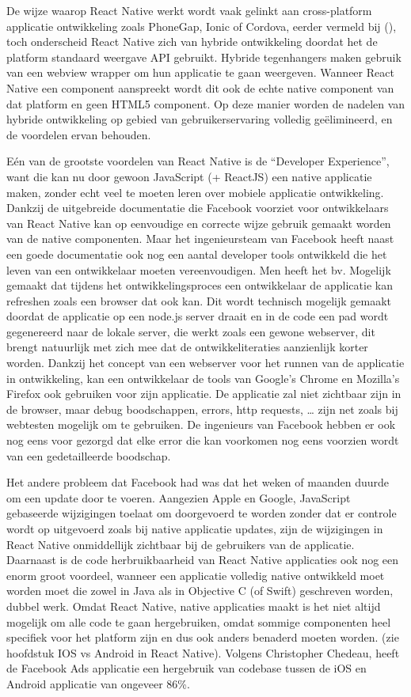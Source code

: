 De wijze waarop React Native werkt wordt vaak gelinkt aan cross-platform applicatie ontwikkeling zoals PhoneGap, Ionic of Cordova, eerder vermeld bij (), toch onderscheid React Native zich van hybride ontwikkeling doordat het de platform standaard weergave API gebruikt. Hybride tegenhangers maken gebruik van een webview wrapper om hun applicatie te gaan weergeven. Wanneer React Native een component aanspreekt wordt dit ook de echte native component van dat platform en geen HTML5 component. Op deze manier worden de nadelen van hybride ontwikkeling op gebied van gebruikerservaring volledig geëlimineerd, en de voordelen ervan behouden. 

Eén van de grootste voordelen van React Native is de ``Developer Experience'', want die kan nu door gewoon JavaScript (+ ReactJS) een native applicatie maken, zonder echt veel te moeten leren over mobiele applicatie ontwikkeling. Dankzij de uitgebreide documentatie die Facebook voorziet voor ontwikkelaars van React Native kan op eenvoudige en correcte wijze gebruik gemaakt worden van de native componenten. Maar het ingenieursteam van Facebook heeft naast een goede documentatie ook nog een aantal developer tools ontwikkeld die het leven van een ontwikkelaar moeten vereenvoudigen. Men heeft het bv. Mogelijk gemaakt dat tijdens het ontwikkelingsproces een ontwikkelaar de applicatie kan refreshen zoals een browser dat ook kan. Dit wordt technisch mogelijk gemaakt doordat de applicatie op een node.js server draait en in de code een pad wordt gegenereerd naar de lokale server, die werkt zoals een gewone webserver, dit brengt natuurlijk met zich mee dat de ontwikkeliteraties aanzienlijk korter worden.
Dankzij het concept van een webserver voor het runnen van de applicatie in ontwikkeling, kan een ontwikkelaar de tools van Google’s Chrome en Mozilla’s Firefox ook gebruiken voor zijn applicatie. De applicatie zal niet zichtbaar zijn in de browser, maar debug boodschappen, errors, http requests, … zijn net zoals bij webtesten mogelijk om te gebruiken. De ingenieurs van Facebook hebben er ook nog eens voor gezorgd dat elke error die kan voorkomen nog eens voorzien wordt van een gedetailleerde boodschap. 

Het andere probleem dat Facebook had was dat het weken of maanden duurde om een update door te voeren. Aangezien Apple en Google, JavaScript gebaseerde wijzigingen toelaat om doorgevoerd te worden zonder dat er controle wordt op uitgevoerd zoals bij native applicatie updates, zijn de wijzigingen in React Native onmiddellijk zichtbaar bij de gebruikers van de applicatie.
Daarnaast is de code herbruikbaarheid van React Native applicaties ook nog een enorm groot voordeel, wanneer een applicatie volledig native ontwikkeld moet worden moet die zowel in Java als in Objective C (of Swift) geschreven worden, dubbel werk. Omdat React Native, native applicaties maakt is het niet altijd mogelijk om alle code te gaan hergebruiken, omdat sommige componenten heel specifiek voor het platform zijn en dus ook anders benaderd moeten worden. (zie hoofdstuk IOS vs Android in React Native). Volgens Christopher Chedeau, heeft de Facebook Ads applicatie een hergebruik van codebase tussen de iOS en Android applicatie van ongeveer 86\%. \citep{chedeau:React} 

